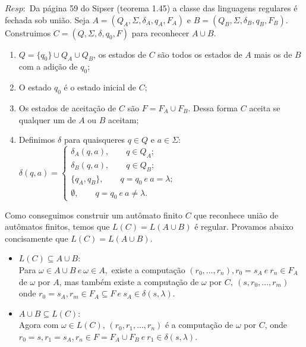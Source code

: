 \documentclass{homework}
\begin{document}
	$Resp:$ Da página 59 do Sipser (teorema 1.45) a classe das linguagens regulares é fechada sob união.
	Seja $A =(Q_A,\Sigma,\delta_A,q_A,F_A)$ e $B = (Q_B,\Sigma,\delta_B,q_B,F_B)$.\\
	Construimos $C = (Q,\Sigma,\delta,q_0,F)$ para reconhecer $A \cup B$.
	\begin{enumerate}
		\item $Q = \{q_0\} \cup Q_A \cup Q_B$, os estados de $C$ são todos os estados de $A$ mais os de $B$ com a adição de $q_0$;
		\item O estado $q_0$ é o estado inicial de $C$;
		\item Os estados de aceitação de $C$ são $F = F_A \cup F_B$. Dessa forma $C$ aceita se qualquer um de $A$ ou $B$ aceitam;
		\item Definimos $\delta$ para quaisqueres $q \in Q$ e $a \in \Sigma$:\\
		$\delta(q,a) = \begin{cases}
							\delta_A(q,a),\qquad q \in Q_A;\\
							\delta_B(q,a),\qquad q \in Q_B;\\
							\{q_A,q_B\},\qquad q = q_0 \ e \ a = \lambda;\\
							\emptyset, \qquad  q = q_0 \ e \ a \neq \lambda.
					   \end{cases}					  
		$
	\end{enumerate}
	Como conseguimos construir um autômato finito $C$ que reconhece união de autômatos finitos, temos que $L(C) = L(A \cup B)$ é regular. Provamos abaixo concisamente que $L(C) = L(A \cup B)$.
	\begin{itemize}
		\item $L(C) \subseteq A \cup B$:\\
			Para $\omega \in A \cup B \ e\ \omega \in A,$ existe a computação $(r_0,...,r_n),r_0=s_A\ e\ r_n \in F_A$ de $\omega$ por $A$, mas também existe a computação de $\omega$ por $C,\ (s,r_0,...,r_m)$ onde $r_0=s_A,r_m \in F_A \subseteq F\ e\ s_A \in \delta(s,\lambda)$.
		\item $A \cup B \subseteq L(C)$:\\
			Agora com $\omega \in L(C)$, $(r_0,r_1,...,r_n)$ é a computação de $\omega$ por $C$, onde $r_0=s, r_1=s_A, r_n \in F = F_A \cup F_B\ e\ r_1 \in \delta(s,\lambda)$.
	\end{itemize}

\pagebreak

\end{document}
